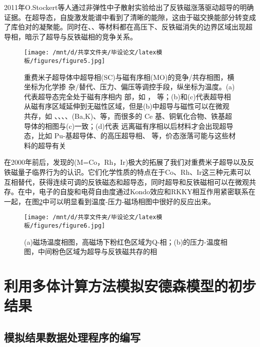 2011年O.Stockert等人通过非弹性中子散射实验给出了反铁磁涨落驱动超导的明确证据。在超导态，自旋激发能谱中看到了清晰的能隙，这由于磁交换能部分转变成了库伯对的凝聚能。同时在、、等材料都在高压下、反铁磁消失的边界区域出现超导相，暗示了超导与反铁磁相的竞争关系。



\begin{figure}[h]
    \texttt{[image: /mnt/d/共享文件夹/毕设论文/latex模板/figures/figure5.jpg]}
    \caption{重费米子超导体中超导相(SC)与磁有序相(MO)的竞争/共存相图，横坐标为化学掺 杂/替代、压力、偏压等调控手段，纵坐标为温度。(a)代表超导态完全处于磁有序相内 部，如 ， 等；(b)和(c)代表超导相从磁有序区域延伸到无磁性区域，但是(b)中超导与磁性可以在微观共存，如 、、、、(Ba,K)、等，而很多的 Ce 基、铜氧化合物、铁基超导体的相图与(c)一致；(d)代表 远离磁有序相以后材料才会出现超导态，比如 Pu-基超导体、的高压超导相、 等，价态涨落可能与这些材料的超导有关}
    \label{fig3}
\end{figure}

在2000年前后，发现的(M=Co，Rh，Ir)极大的拓展了我们对重费米子超导以及反铁磁量子临界行为的认识。它们化学性质的特点在于Co、Rh、Ir这三种元素可以互相替代，获得连续可调的反铁磁态和超导态，同时超导和反铁磁相可以在微观共存。在中，电子的自旋和电荷自由度通过Kondo效应和RKKY相互作用紧密联系在一起，在图\ref{fig4}中可以明显看到温度-压力-磁场相图中很好的反应出来。
\begin{figure}[h]
    \texttt{[image: /mnt/d/共享文件夹/毕设论文/latex模板/figures/figure6.jpg]}
    \caption{(a)磁场温度相图，高磁场下粉红色区域为Q-相；(b)的压力-温度相图，中间粉色区域为超导与反铁磁共存的相}
    \label{fig4}
\end{figure}









\section{利用多体计算方法模拟安德森模型的初步结果}
\subsection{模拟结果数据处理程序的编写}

